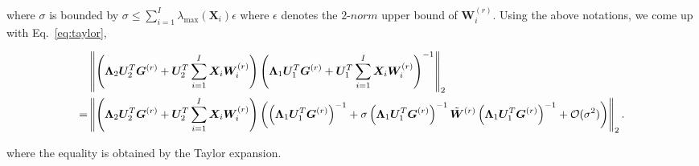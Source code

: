 \documentclass[10pt,journal]{IEEEtran}
\newcommand{\G}{\boldsymbol{G}}
\newcommand{\X}{\boldsymbol{X}}
\newcommand{\U}{\boldsymbol{U}}
\begin{document}
where $\sigma$ is bounded by $\sigma \leq \sum_{i=1}^I\lambda_{\max}(\X_i)\epsilon$
where $\epsilon$ denotes the $2$-$norm$ upper bound of ${\bm W}_i^{(r)}$.
Using the above notations, we come up with Eq.~\eqref{eq:taylor},
\begin{figure}[t]
\begin{align}\label{eq:taylor}
&\left\|\left(\bm \Lambda_2 \U_2^T\G^{(r)} + \U_2^T  \sum_{i=1}^I \X_i{\bm W}_i^{(r)} \right)\left(\bm \Lambda_1 \U_1^T\G^{(r)} + \U_1^T \sum_{i=1}^I \X_i{\bm W}_i^{(r)}  \right)^{-1}\right\|_2 \nonumber\\
= &\left\|\left(\bm \Lambda_2 \U_2^T\G^{(r)} + \U_2^T  \sum_{i=1}^I \X_i{\bm W}_i^{(r)} \right)\left(  \left(\bm \Lambda_1 \U_1^T\G^{(r)}\right)^{-1} + \sigma \left(\bm \Lambda_1 \U_1^T\G^{(r)}\right)^{-1} \tilde{\bm W}^{(r)}\left(\bm \Lambda_1 \U_1^T\G^{(r)}\right)^{-1} + {\cal O}(\sigma^2) \right)\right\|_2.
\end{align}
\hrulefill
\end{figure}
where the equality is obtained by the Taylor expansion.
\end{document}
